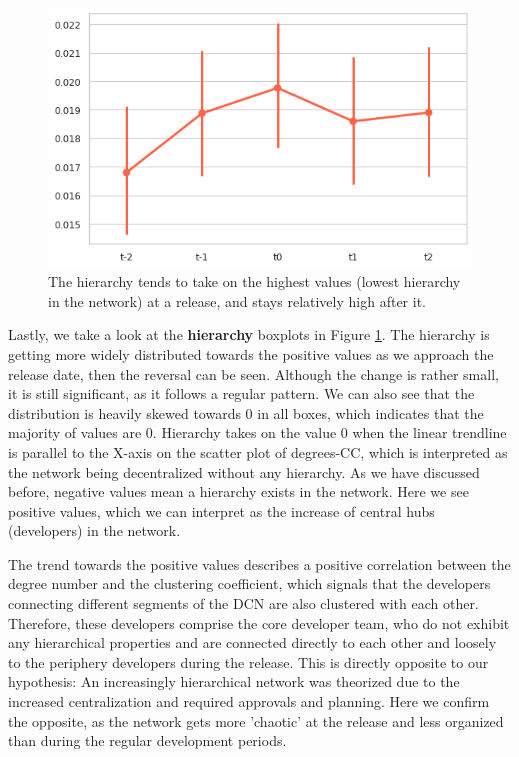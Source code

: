 \begin{figure}[!htbp]
    \centering
    \includegraphics[width=\textwidth]{figures/quantitative/pointplots/hierarchy.png}
    \caption{The hierarchy tends to take on the highest values (lowest hierarchy in the network) at a release, and stays relatively high after it.}
    \label{fig:hierarchy-box}
\end{figure}

Lastly, we take a look at the \textbf{hierarchy} boxplots in Figure \ref{fig:hierarchy-box}. The hierarchy is getting more widely distributed towards the positive values as we approach the release date, then the reversal can be seen. Although the change is rather small, it is still significant, as it follows a regular pattern. We can also see that the distribution is heavily skewed towards $0$ in all boxes, which indicates that the majority of values are $0$. Hierarchy takes on the value $0$ when the linear trendline is parallel to the X-axis on the scatter plot of degrees-CC, which is interpreted as the network being decentralized without any hierarchy. As we have discussed before, negative values mean a hierarchy exists in the network. Here we see positive values, which we can interpret as the increase of central hubs (developers) in the network. 

The trend towards the positive values describes a positive correlation between the degree number and the clustering coefficient, which signals that the developers connecting different segments of the DCN are also clustered with each other. Therefore, these developers comprise the core developer team, who do not exhibit any hierarchical properties and are connected directly to each other and loosely to the periphery developers during the release. This is directly opposite to our hypothesis: An increasingly hierarchical network was theorized due to the increased centralization and required approvals and planning. Here we confirm the opposite, as the network gets more 'chaotic' at the release and less organized than during the regular development periods.

